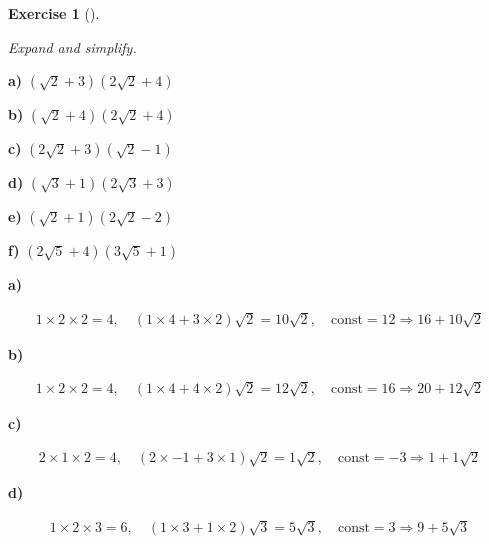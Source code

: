 \documentclass[
  letterpaper,
  DIV=11,
  numbers=noendperiod]{scrreprt}
\theoremstyle{definition}
\newtheorem{exercise}{Exercise}[chapter]
\theoremstyle{remark}
\begin{document}
\begin{exercise}[]\protect\hypertarget{exr-u2-48}{}\label{exr-u2-48}

\emph{Expand and simplify.}

\textbf{a)} \(\displaystyle (\sqrt{2} + 3)(2\sqrt{2} + 4)\)

\textbf{b)} \(\displaystyle (\sqrt{2} + 4)(2\sqrt{2} + 4)\)

\textbf{c)} \(\displaystyle (2\sqrt{2} + 3)(\sqrt{2} - 1)\)

\textbf{d)} \(\displaystyle (\sqrt{3} + 1)(2\sqrt{3} + 3)\)

\textbf{e)} \(\displaystyle (\sqrt{2} + 1)(2\sqrt{2} - 2)\)

\textbf{f)} \(\displaystyle (2\sqrt{5} + 4)(3\sqrt{5} + 1)\)

\begin{tcolorbox}[enhanced jigsaw, opacitybacktitle=0.6, coltitle=black, arc=.35mm, colframe=quarto-callout-tip-color-frame, colback=white, bottomrule=.15mm, left=2mm, colbacktitle=quarto-callout-tip-color!10!white, titlerule=0mm, opacityback=0, title=\textcolor{quarto-callout-tip-color}{\faLightbulb}\hspace{0.5em}{🔍 View Solutions}, leftrule=.75mm, breakable, rightrule=.15mm, bottomtitle=1mm, toptitle=1mm, toprule=.15mm]

\textbf{a)}

\[
\begin{aligned}
1\times 2\times 2=4,\quad(1\times 4+3\times 2)\sqrt{2}=10\sqrt{2},\quad\text{const}=12 \Rightarrow 16 + 10\sqrt{2}
\end{aligned}
\]

\textbf{b)}

\[
\begin{aligned}
1\times 2\times 2=4,\quad(1\times 4+4\times 2)\sqrt{2}=12\sqrt{2},\quad\text{const}=16 \Rightarrow 20 + 12\sqrt{2}
\end{aligned}
\]

\textbf{c)}

\[
\begin{aligned}
2\times 1\times 2=4,\quad(2\times -1+3\times 1)\sqrt{2}=1\sqrt{2},\quad\text{const}=-3 \Rightarrow 1 + 1\sqrt{2}
\end{aligned}
\]

\textbf{d)}

\[
\begin{aligned}
1\times 2\times 3=6,\quad(1\times 3+1\times 2)\sqrt{3}=5\sqrt{3},\quad\text{const}=3 \Rightarrow 9 + 5\sqrt{3}
\end{aligned}
\]


\end{tcolorbox}
\end{exercise}
\end{document}
